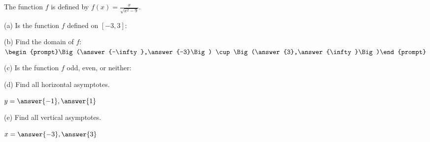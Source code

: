 \documentclass{ximera}
\author{Tom Dinitz and Nela Lakos}
\begin{document}
\begin{exercise}

The function $f$ is defined by $f(x)=\frac{x}{\sqrt{x^2-9}}$.

(a) Is the function $f$ defined on $[-3,3]$:
\begin{prompt}
\begin{multipleChoice}
\end{multipleChoice}
\end{prompt}

(b) Find the domain of $f$: $\begin{prompt}\Big(\answer{-\infty},\answer{-3}\Big) \cup \Big(\answer{3},\answer{\infty}\Big)\end{prompt}$

(c) Is the function $f$ odd, even, or neither:
\begin{prompt}
\begin{multipleChoice}
\end{multipleChoice}
\end{prompt} 

(d) Find all horizontal asymptotes. \begin{prompt} $y=\answer{-1},\answer{1}$\end{prompt}

(e) Find all vertical asymptotes. \begin{prompt} $x=\answer{-3},\answer{3}$\end{prompt}

\end{exercise}
\end{document}
